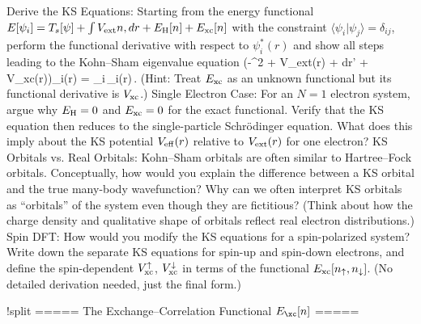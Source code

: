 Derive the KS Equations: Starting from the energy functional $E[{\psi_i}] = T_s[{\psi}] + \int V_{\rm ext} n,dr + E_{\rm H}[n] + E_{\rm xc}[n]$ with the constraint $\langle \psi_i|\psi_j\rangle = \delta_{ij}$, perform the functional derivative with respect to $\psi_i^*(r)$ and show all steps leading to the Kohn–Sham eigenvalue equation \Big(-\nabla^2 + V_{\rm ext}(r) + \int {}dr’ + V_{\rm xc}(r)\Big)\psi_i(r) = \epsilon_i\,\psi_i(r)\,. (Hint: Treat $E_{\rm xc}$ as an unknown functional but its functional derivative is $V_{\rm xc}$.)
Single Electron Case: For an $N=1$ electron system, argue why $E_{\rm H}=0$ and $E_{\rm xc}=0$ for the exact functional. Verify that the KS equation then reduces to the single-particle Schrödinger equation. What does this imply about the KS potential $V_{\rm eff}(r)$ relative to $V_{\rm ext}(r)$ for one electron?
KS Orbitals vs. Real Orbitals: Kohn–Sham orbitals are often similar to Hartree–Fock orbitals. Conceptually, how would you explain the difference between a KS orbital and the true many-body wavefunction? Why can we often interpret KS orbitals as “orbitals” of the system even though they are fictitious? (Think about how the charge density and qualitative shape of orbitals reflect real electron distributions.)
Spin DFT: How would you modify the KS equations for a spin-polarized system? Write down the separate KS equations for spin-up and spin-down electrons, and define the spin-dependent $V_{\rm xc}^\uparrow$, $V_{\rm xc}^\downarrow$ in terms of the functional $E_{\rm xc}[n_\uparrow, n_\downarrow]$. (No detailed derivation needed, just the final form.)




!split
===== The Exchange–Correlation Functional $E_{\xc}[n]$ =====

